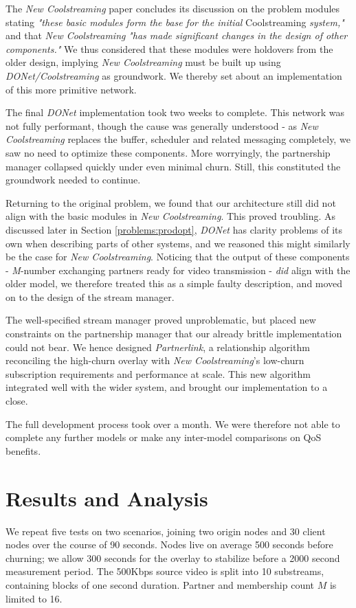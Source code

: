 \documentclass[12pt,a4paper]{article}
\begin{document}
The \textit{New Coolstreaming} paper concludes its discussion on the problem modules stating \textit{"these basic modules form the base for the initial }Coolstreaming\textit{ system,"} and that \textit{New Coolstreaming} \textit{"has made significant changes in the design of other components."} We thus considered that these modules were holdovers from the older design, implying \textit{New Coolstreaming} must be built up using \textit{DONet/Coolstreaming} as groundwork. We thereby set about an implementation of this more primitive network.

The final \textit{DONet} implementation took two weeks to complete. This network was not fully performant, though the cause was generally understood - as \textit{New Coolstreaming} replaces the buffer, scheduler and related messaging completely, we saw no need to optimize these components. More worryingly, the partnership manager collapsed quickly under even minimal churn. Still, this constituted the groundwork needed to continue.

Returning to the original problem, we found that our architecture still did not align with the basic modules in \textit{New Coolstreaming}. This proved troubling. As discussed later in Section \ref{problems:prodopt}, \textit{DONet} has clarity problems of its own when describing parts of other systems, and we reasoned this might similarly be the case for \textit{New Coolstreaming}. Noticing that the output of these components - \textit{M}-number exchanging partners ready for video transmission - \textit{did} align with the older model, we therefore treated this as a simple faulty description, and moved on to the design of the stream manager.

The well-specified stream manager proved unproblematic, but placed new constraints on the partnership manager that our already brittle implementation could not bear. We hence designed \textit{Partnerlink}, a relationship algorithm reconciling the high-churn overlay with \textit{New Coolstreaming}'s low-churn subscription requirements and performance at scale. This new algorithm integrated well with the wider system, and brought our implementation to a close.

The full development process took over a month. We were therefore not able to complete any further models or make any inter-model comparisons on QoS benefits.

\section{Results and Analysis} \label{results}
We repeat five tests on two scenarios, joining two origin nodes and 30 client nodes over the course of 90 seconds. Nodes live on average 500 seconds before churning; we allow 300 seconds for the overlay to stabilize before a 2000 second measurement period. The 500Kbps source video is split into 10 substreams, containing blocks of one second duration. Partner and membership count \(M\) is limited to 16.
\end{document}
